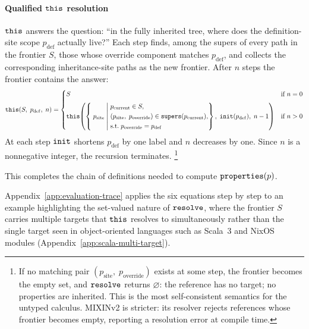 \paragraph{Qualified $\mathtt{this}$ resolution}
$\mathtt{this}$ answers the question:
``in the fully inherited tree, where does
the definition-site scope $p_{\mathrm{def}}$ actually live?''
Each step finds, among the supers of every path in the
frontier $S$, those whose override component matches
$p_{\mathrm{def}}$, and collects the corresponding
inheritance-site paths as the new frontier.
After $n$ steps the frontier contains the answer:
{\small
  \begin{equation}\label{eq:this}
    \mathtt{this}(S,\; p_{\mathrm{def}},\; n) =
    \begin{cases}
      S & \text{if } n = 0 \\[6pt]
      \mathtt{this}\!\left(
        \left\{\; p_{\mathrm{site}} \;\middle|\;
          \begin{aligned}
            &p_{\mathrm{current}} \in S, \\
            &(p_{\mathrm{site}},\; p_{\mathrm{override}})
            \in \mathtt{supers}(p_{\mathrm{current}}), \\
            &\text{s.t.}\; p_{\mathrm{override}} = p_{\mathrm{def}}
          \end{aligned}
        \right\},\;
        \mathtt{init}(p_{\mathrm{def}}),\;
        n - 1
      \right)
      & \text{if } n > 0
    \end{cases}
\end{equation}}%
At each step $\mathtt{init}$ shortens $p_{\mathrm{def}}$ by one label
and $n$ decreases by one.
Since $n$ is a nonnegative integer, the recursion terminates.%
\footnote{
  If no matching pair
  $(p_{\mathrm{site}},\; p_{\mathrm{override}})$ exists
  at some step, the frontier becomes the empty set, and
  $\mathtt{resolve}$ returns $\varnothing$: the reference has no
  target; no properties are inherited.
  This is the most self-consistent semantics for the
  untyped calculus.
  MIXINv2 is stricter: its resolver rejects
  references whose frontier becomes empty, reporting a
  resolution error at compile time.
}

This completes the chain of definitions needed to compute $\mathtt{properties}(p)$.

Appendix~\ref{app:evaluation-trace} applies the six equations step by
step to an example highlighting the set-valued nature of $\mathtt{resolve}$,
where the frontier $S$ carries multiple targets that
$\mathtt{this}$ resolves to simultaneously rather than the single target
seen in object-oriented languages such as Scala~3 and NixOS modules
(Appendix~\ref{app:scala-multi-target}).

